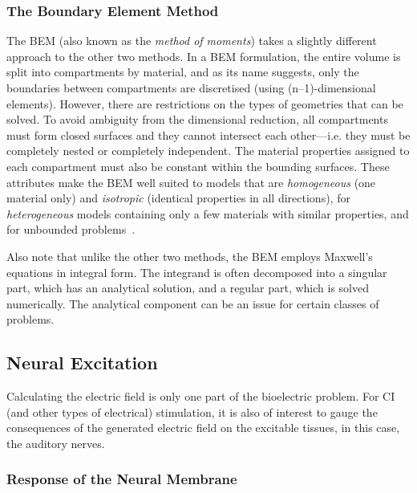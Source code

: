 
\subsubsection{The Boundary Element Method}

The BEM (also known as the \emph{method of moments}) takes a slightly different
approach to the other two methods. In a BEM formulation, the entire volume is
split into compartments by material, and as its name suggests, only the
boundaries between compartments are discretised (using (n--1)-dimensional
elements). However, there are restrictions on the types of geometries that can
be solved. To avoid ambiguity from the dimensional reduction, all compartments
must form closed surfaces and they cannot intersect each other---i.e. they must be
completely nested or completely independent. The material properties assigned to
each compartment must also be constant within the bounding surfaces. These
attributes make the BEM well suited to models that are \emph{homogeneous} (one
material only) and \emph{isotropic} (identical properties in all directions),
for \emph{heterogeneous} models containing only a few materials with similar
properties, and for unbounded problems~\cite{katsikadelis2002}.

Also note that unlike the other two methods, the BEM employs Maxwell's equations
in integral form. The integrand is often decomposed into a singular part, which
has an analytical solution, and a regular part, which is solved numerically.
The analytical component can be an issue for certain classes of problems.

\subsection{Neural Excitation}
\label{sect:neural_excitation}

Calculating the electric field is only one part of the bioelectric problem. For
CI (and other types of electrical) stimulation, it is also of interest to gauge
the consequences of the generated electric field on the excitable tissues, in
this case, the auditory nerves.

\subsubsection{Response of the Neural Membrane}

